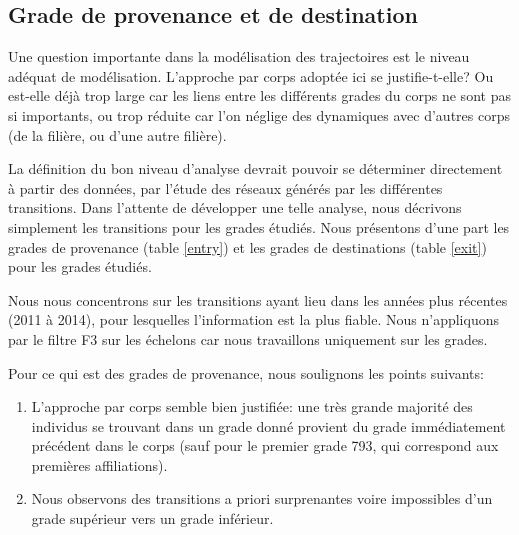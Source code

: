 \documentclass[11pt,a4paper]{article}
\begin{document}
\bigskip

\subsection{Grade de provenance et de destination}


Une question importante dans la modélisation des trajectoires est le niveau adéquat de modélisation. L'approche par corps adoptée ici se justifie-t-elle? Ou est-elle déjà trop large car les liens entre les différents grades du corps ne sont pas si importants, ou trop réduite car l'on néglige des dynamiques avec d'autres corps (de la filière, ou d'une autre filière). 

La définition du bon niveau d'analyse devrait pouvoir se déterminer directement à partir des données, par l'étude des réseaux générés par les différentes transitions. Dans l'attente de développer une telle analyse, nous décrivons simplement les transitions pour les grades étudiés. Nous présentons d'une part les grades de provenance (table \ref{entry}) et les grades de destinations (table \ref{exit}) pour les grades étudiés. 

Nous nous concentrons sur les transitions ayant lieu dans les années plus récentes (2011 à 2014), pour lesquelles l'information est la plus fiable. Nous n'appliquons par le filtre F3 sur les échelons car nous travaillons uniquement sur les grades. 

\bigskip

Pour ce qui est des grades de provenance, nous soulignons les points suivants: 
\begin{enumerate}[leftmargin=1cm ,parsep=0cm,itemsep=0cm,topsep=0cm] 
\item L'approche par corps semble bien justifiée: une très grande majorité des individus se trouvant dans un grade donné provient du grade immédiatement précédent dans le corps (sauf pour le premier grade 793, qui correspond aux premières affiliations).  
\item Nous observons des transitions a priori surprenantes voire impossibles d'un grade supérieur vers un grade inférieur.  
\end{enumerate}

\medskip
\end{document}
